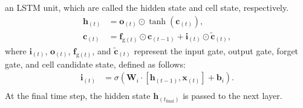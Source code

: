 \documentclass[3p]{elsarticle}
\begin{document}
an LSTM unit, which are called the hidden state and cell state, respectively.
\begin{align}
\mathbf{h}_{(t)} &= \mathbf{o}_{(t)} \odot \tanh(\mathbf{c}_{(t)}), \\
\mathbf{c}_{(t)} &= \mathbf{f}_{\text{g}(t)} \odot \mathbf{c}_{(t-1)} + \mathbf{i}_{(t)} \odot \tilde{\mathbf{c}}_{(t)},
\end{align}
where \( \mathbf{i}_{(t)} \), \( \mathbf{o}_{(t)} \), \( \mathbf{f}_{\text{g}(t)} \), and \( \tilde{\mathbf{c}}_{(t)} \) represent the input gate, output gate, forget gate, and cell candidate state, defined as follows:
\begin{align}
\mathbf{i}_{(t)} &= \sigma(\mathbf{W}_i \cdot [\mathbf{h}_{(t-1)}, \mathbf{x}_{(t)}] + \mathbf{b}_i). \\
\end{align}
At the final time step, the hidden state \( \mathbf{h}_{(t_{\text{final}})} \) is passed to the next layer.









\end{document}
